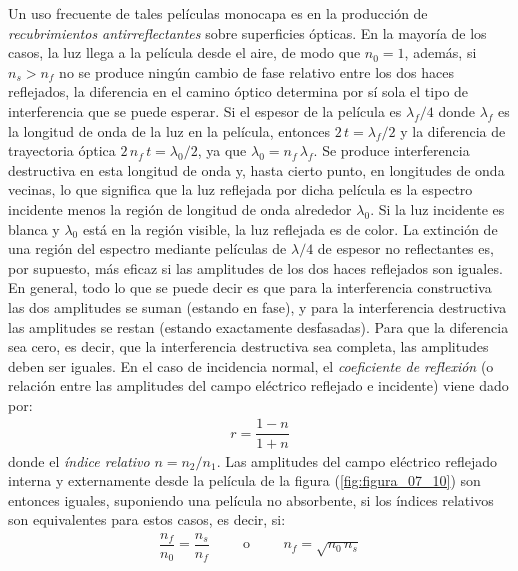 \documentclass[14pt]{extarticle}
\begin{document}
Un uso frecuente de tales películas monocapa es en la producción de \textit{recubrimientos antirreflectantes} sobre superficies ópticas. En la mayoría de los casos, la luz llega a la película desde el aire, de modo que $n_{0} =1$, además, si $n_{s} > n_{f}$ no se produce ningún cambio de fase relativo entre los dos haces reflejados, la diferencia en el camino óptico determina por sí sola el tipo de interferencia que se puede esperar. Si el espesor de la película es $\lambda_{f}/4$ donde $\lambda_{f}$ es la longitud de onda de la luz en la película, entonces $2 \, t = \lambda_{f}/2$ y la diferencia de trayectoria óptica $2 \, n_{f} \, t = \lambda_{0}/2$, ya que $\lambda_{0} = n_{f} \, \lambda_{f}$. Se produce interferencia destructiva en esta longitud de onda y, hasta cierto punto, en longitudes de onda vecinas, lo que significa que la luz reflejada por dicha película es la espectro incidente menos la región de longitud de onda alrededor $\lambda_{0}$. Si la luz incidente es blanca y $\lambda_{0}$ está en la región visible, la luz reflejada es de color. La extinción de una región del espectro mediante películas de $\lambda/4$ de espesor no reflectantes es, por supuesto, más eficaz si las amplitudes de los dos haces reflejados son iguales. En general, todo lo que se puede decir es que para la interferencia constructiva las dos amplitudes se suman (estando en fase), y para la interferencia destructiva las amplitudes se restan (estando exactamente desfasadas). Para que la diferencia sea cero, es decir, que la interferencia destructiva sea completa, las amplitudes deben ser iguales. En el caso de incidencia normal, el \textit{coeficiente de reflexión} (o relación entre las amplitudes del campo eléctrico reflejado e incidente) viene dado por:
\begin{align}
r = \dfrac{1 - n}{1 + n}
\label{eq:ecuacion_07_27}
\end{align}
donde el \textit{índice relativo} $n = n_{2}/n_{1}$. Las amplitudes del campo eléctrico reflejado interna y externamente desde la película de la figura (\ref{fig:figura_07_10}) son entonces iguales, suponiendo una película no absorbente, si los índices relativos son equivalentes para estos casos, es decir, si:
\begin{align}
\dfrac{n_{f}}{n_{0}} = \dfrac{n_{s}}{n_{f}} \hspace{1cm} \text{o} \hspace{1cm} n_{f} = \sqrt{n_{0} \, n_{s}}
\label{eq:ecuacion_07_28}
\end{align}
\end{document}
